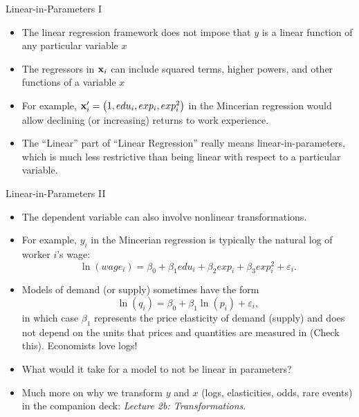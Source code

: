 \documentclass[aspectratio=169,11pt]{beamer}
\begin{document}

\begin{frame}{Linear-in-Parameters I}
\begin{itemize}
	\item The linear regression framework does not impose that $y$ is a linear function of any
	particular variable $x$

	\medskip
	\item The regressors in ${\bf x}_i$ can include squared terms, higher powers, and other functions of 
	a variable $x$

	\medskip
	\item For example, ${\bf x}_i' = \left(1,edu_i,exp_i,exp_i^2\right)$ in the Mincerian regression would allow
	declining (or increasing) returns to work experience. 

	\medskip
	\item The ``Linear'' part of ``Linear Regression'' really means linear-in-parameters, which is much less
	 restrictive than being linear with respect to a particular variable.
\end{itemize}
\end{frame}

\begin{frame}{Linear-in-Parameters II}
\begin{itemize}
	\item The dependent variable can also involve nonlinear transformations.

	\smallskip	
	\item For example, $y_{i}$ in the Mincerian regression is typically the natural log of worker $i$'s wage:\[
\ln \left(wage_{i}\right)=\beta_{0}+\beta_{1}edu_{i}+\beta_{2}exp_{i}+\beta_{3}exp_{i}^{2}+\varepsilon_{i}.
\]

	\smallskip
	\item Models of demand (or supply) sometimes have the form\[
		\ln \left( q_{i} \right) = \beta_0 + \beta_1 \ln \left( p_{i}\right) + \varepsilon_i,
	\]
	in which case $ \beta_1$ represents the price elasticity of demand (supply) and does not depend on the units that prices
	and quantities are measured in  (Check this). Economists love logs!
	

	\smallskip
	\item What would it take for a model to not be linear in parameters?

	\smallskip
	\item Much more on \alert{why} we transform $y$ and $x$ (logs, elasticities,
	odds, rare events) in the companion deck: \emph{Lecture 2b: Transformations}.
\end{itemize}
\end{frame}
\end{document}
